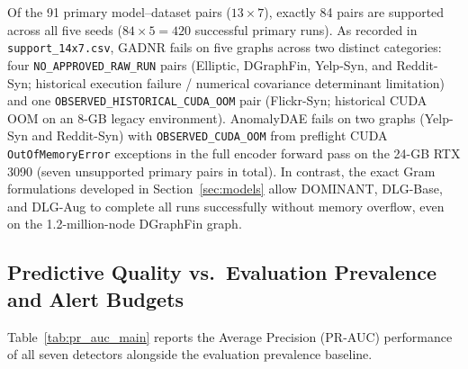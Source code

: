 \documentclass[11pt,a4paper]{article}
\begin{document}
Of the 91 primary model--dataset pairs ($13 \times 7$), exactly 84 pairs are supported across all five seeds ($84 \times 5 = 420$ successful primary runs). As recorded in \texttt{support\_14x7.csv}, GADNR fails on five graphs across two distinct categories: four \texttt{NO\_APPROVED\_RAW\_RUN} pairs (Elliptic, DGraphFin, Yelp-Syn, and Reddit-Syn; historical execution failure / numerical covariance determinant limitation) and one \texttt{OBSERVED\_HISTORICAL\_CUDA\_OOM} pair (Flickr-Syn; historical CUDA OOM on an 8-GB legacy environment). AnomalyDAE fails on two graphs (Yelp-Syn and Reddit-Syn) with \texttt{OBSERVED\_CUDA\_OOM} from preflight CUDA \texttt{OutOfMemoryError} exceptions in the full encoder forward pass on the 24-GB RTX 3090 (seven unsupported primary pairs in total). In contrast, the exact Gram formulations developed in Section~\ref{sec:models} allow DOMINANT, DLG-Base, and DLG-Aug to complete all runs successfully without memory overflow, even on the 1.2-million-node DGraphFin graph.

\subsection{Predictive Quality vs.\ Evaluation Prevalence and Alert Budgets}
Table~\ref{tab:pr_auc_main} reports the Average Precision (PR-AUC) performance of all seven detectors alongside the evaluation prevalence baseline.
\end{document}
